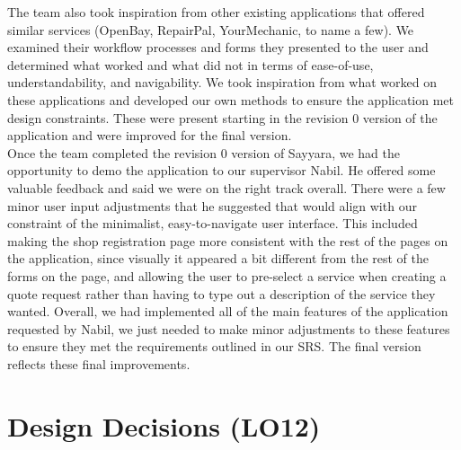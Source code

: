 \documentclass{article}
\begin{document}
\noindent The team also took inspiration from other existing applications that offered similar services (OpenBay, RepairPal, YourMechanic, to name a few).
We examined their workflow processes and forms they presented to the user and determined what worked and what did not in terms of ease-of-use,
understandability, and navigability. We took inspiration from what worked on these applications and developed our own methods to ensure the application met
design constraints. These were present starting in the revision 0 version of the application and were improved for the final version.\\

\noindent Once the team completed the revision 0 version of Sayyara, we had the opportunity to demo the application to our supervisor Nabil. He offered some
valuable feedback and said we were on the right track overall. There were a few minor user input adjustments that he suggested that would align with our
constraint of the minimalist, easy-to-navigate user interface. This included making the shop registration page more consistent with the rest of the pages on
the application, since visually it appeared a bit different from the rest of the forms on the page, and allowing the user to pre-select a service when
creating a quote request rather than having to type out a description of the service they wanted. Overall, we had implemented all of the main features of
the application requested by Nabil, we just needed to make minor adjustments to these features to ensure they met the requirements outlined in our SRS. The
final version reflects these final improvements.

\section{Design Decisions (LO12)}
\end{document}
